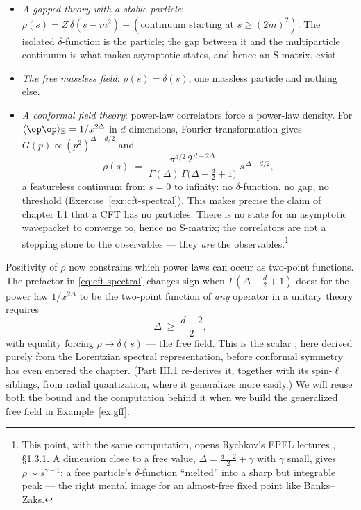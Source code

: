 \begin{itemize}
\item \emph{A gapped theory with a stable particle}: $\rho(s) = Z\,\delta(s -
m^2) + (\text{continuum starting at } s \ge (2m)^2)$. The isolated
$\delta$-function is the particle; the gap between it and the multiparticle
continuum is what makes asymptotic states, and hence an S-matrix, exist.
\item \emph{The free massless field}: $\rho(s) = \delta(s)$, one massless
particle and nothing else.
\item \emph{A conformal field theory}: power-law correlators force a power-law
density. For $\langle\op\op\rangle_{\rm E} = 1/x^{2\Delta}$ in $d$ dimensions,
Fourier transformation gives $\tilde G(p) \propto (p^2)^{\Delta - d/2}$ and
\begin{equation}
\rho(s) \;=\; \frac{\pi^{d/2}\, 2^{\,d - 2\Delta}}{\Gamma(\Delta)\,
\Gamma\!\big(\Delta - \tfrac{d}{2} + 1\big)} \; s^{\,\Delta - d/2},
\label{eq:cft-spectral}
\end{equation}
a featureless continuum from $s = 0$ to infinity: no $\delta$-function, no gap,
no threshold (Exercise~\ref{exr:cft-spectral}). This makes precise the claim of
chapter I.1 that a CFT has no particles. There is no state for an asymptotic
wavepacket to converge to, hence no S-matrix; the correlators are not a
stepping stone to the observables --- they \emph{are} the
observables.\footnote{This point, with the same computation, opens Rychkov's
EPFL lectures , \S1.3.1. A dimension close to a free value,
$\Delta = \frac{d-2}{2} + \gamma$ with $\gamma$ small, gives $\rho \sim
s^{\gamma - 1}$: a free particle's $\delta$-function ``melted'' into a sharp
but integrable peak --- the right mental image for an almost-free fixed point
like Banks--Zaks.}
\end{itemize}

Positivity of $\rho$ now constrains which power laws can occur as two-point
functions. The prefactor in
\eqref{eq:cft-spectral}
changes sign when $\Gamma(\Delta - \frac d2 + 1)$ does: for the power law
$1/x^{2\Delta}$ to be the two-point function of \emph{any} operator in a
unitary theory requires
\begin{equation}
\Delta \;\ge\; \frac{d-2}{2},
\label{eq:scalar-unitarity-bound}
\end{equation}
with equality forcing $\rho \to \delta(s)$ --- the free field. This is the
scalar , here derived purely from the Lorentzian
spectral representation, before conformal symmetry has even entered the
chapter. (Part III.1 re-derives it, together with its spin-$\ell$ siblings,
from radial quantization, where it generalizes more easily.) We will reuse both
the bound and the computation behind it when we build the generalized free
field in Example~\ref{ex:gff}.

